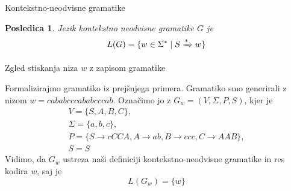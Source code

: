 \documentclass{beamer}
\theoremstyle{definition} %
\theoremstyle{plain} %
\newtheorem{posledica}[definicija]{Posledica}
\begin{document}
\begin{frame}{Kontekstno-neodvisne gramatike}
    
    \begin{posledica}
    
        Jezik kontekstno neodvisne gramatike $ G $ je
        \[
            L(G) = \{ w \in \Sigma^* \mid S \xRightarrow{*} w \}
        \]
    
    \end{posledica}

\end{frame}

\begin{frame}{Zgled stiskanja niza $ w $ z zapisom gramatike}
    
    Formalizirajmo gramatiko iz prejšnjega primera. Gramatiko smo generirali z nizom
    $ w = cababcccababcccab $.
    \pause
    Označimo jo z $ G_w = ( V, \Sigma, P, S ) $, kjer je 
    \begin{gather*}
        V = \{ S, A, B, C \}, \\
        \Sigma = \{ a, b, c \}, \\
        P = \{ S  \rightarrow  cCCA, A  \rightarrow  ab, B  
        \rightarrow  ccc, C  \rightarrow  AAB \}, \\
        S = S
    \end{gather*}
    \pause
    Vidimo, da $ G_w $ ustreza naši definiciji kontekstno-neodvisne gramatike
    in res kodira $ w $, saj je 
    \[
        L(G_w) = \{w\}
    \]

\end{frame}
\end{document}
